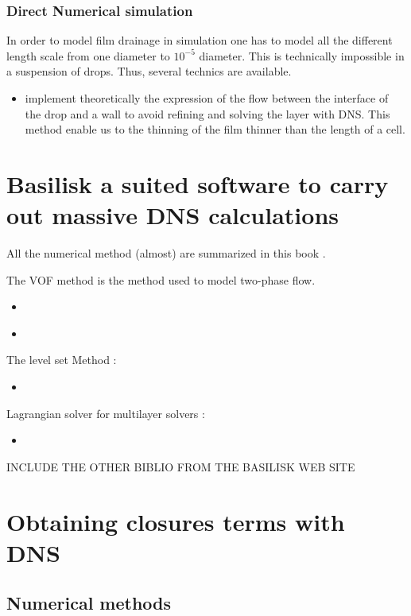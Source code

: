 \subsubsection{Direct Numerical simulation}
In order to model film drainage in simulation one has to model all the different length scale from one diameter to $10^{-5}$ diameter. 
This is technically impossible in a suspension of drops.
Thus, several technics are available. 
\begin{itemize}
    \item \citet{thomas2010multiscale} implement theoretically the expression of the flow between the interface of the drop and a wall to avoid refining and solving the layer with DNS.
     This method enable us to the thinning of the film thinner than the length of a cell. 
\end{itemize}


\section{Basilisk a suited software to carry out massive DNS calculations }
All the numerical method (almost) are summarized in this book \citet{tryggvason2011direct}.

The VOF method is the method used to model two-phase flow. 
\begin{itemize}
    \item \citet{gueyffier1999volume} 
    \item \citet{popinet2009accurate} 
\end{itemize}
The level set Method :
\begin{itemize}
    \item \citet{osher2001level}
\end{itemize}

Lagrangian solver for multilayer solvers :
\begin{itemize}
    \item \citet{popinet2020vertically}
\end{itemize}

INCLUDE THE OTHER BIBLIO FROM THE BASILISK WEB SITE

\section{Obtaining closures terms with DNS}
\subsection{Numerical methods}


